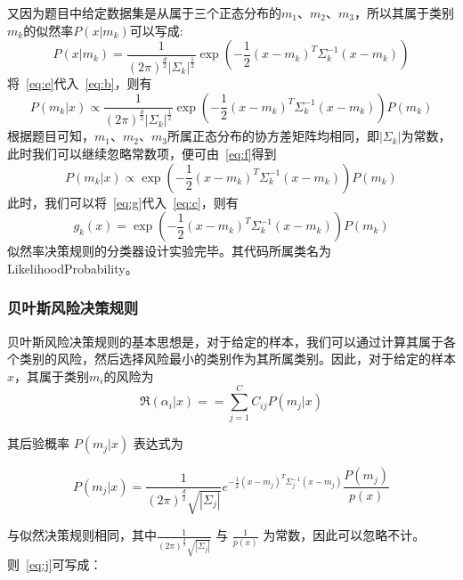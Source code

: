 \documentclass[UTF8]{article} %
\begin{document}
    又因为题目中给定数据集是从属于三个正态分布的$m_1$、$m_2$、$m_3$，所以其属于类别$m_k$的似然率$P(x|m_k)$可以写成:
    \begin{equation}
        P(x|m_k) = \frac{1}{(2\pi)^{\frac{d}{2}}|\Sigma_k|^{\frac{1}{2}}}\exp\left(-\frac{1}{2}(x-m_k)^T\Sigma_k^{-1}(x-m_k)\right) \label{eq:e}
    \end{equation}
    将~\eqref {eq:e}代入~\eqref {eq:b}，则有
    \begin{equation}
        P(m_k|x) \propto \frac{1}{(2\pi)^{\frac{d}{2}}|\Sigma_k|^{\frac{1}{2}}}\exp\left(-\frac{1}{2}(x-m_k)^T\Sigma_k^{-1}(x-m_k)\right)P(m_k) \label{eq:f}
    \end{equation}
    根据题目可知，$m_1$、$m_2$、$m_3$所属正态分布的协方差矩阵均相同，即$|\Sigma_k|$为常数，此时我们可以继续忽略常数项，便可由~\eqref {eq:f}得到
    \begin{equation}
        P(m_k|x) \propto \exp\left(-\frac{1}{2}(x-m_k)^T\Sigma_k^{-1}(x-m_k)\right)P(m_k) \label{eq:g}
    \end{equation}
    此时，我们可以将~\eqref {eq:g}代入~\eqref {eq:c}，则有
    \begin{equation}
        g_k(x) = \exp\left(-\frac{1}{2}(x-m_k)^T\Sigma_k^{-1}(x-m_k)\right)P(m_k) \label{eq:h}
    \end{equation}
    似然率决策规则的分类器设计实验完毕。其代码所属类名为 LikelihoodProbability。

    \subsubsection{贝叶斯风险决策规则}
    贝叶斯风险决策规则的基本思想是，对于给定的样本，我们可以通过计算其属于各个类别的风险，然后选择风险最小的类别作为其所属类别。因此，对于给定的样本$x$，其属于类别$m_i$的风险为
    \begin{equation}
        \Re(\alpha_i|x) = = \sum_{j = 1}^{C} C_{ij} P(m_j|x) \label{eq:i}
    \end{equation}

    其后验概率 $P(m_j|x)$ 表达式为

    \begin{equation}
        P(m_j|x) = \frac{1}{(2\pi)^{\frac{d}{2}} \sqrt{|\Sigma_j|}}e^{-\frac{1}{2}(x-m_j)^T\Sigma_j^{-1}(x-m_j)}\frac{P(m_j)}{p(x)} \label{eq:j}
    \end{equation}

    与似然决策规则相同，其中$\frac{1}{(2\pi)^{\frac{d}{2}} \sqrt{|\Sigma_j|}}$ 与 $\frac{1}{p(x)}$ 为常数，因此可以忽略不计。则~\eqref {eq:j}可写成：
\end{document}
